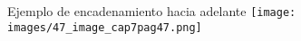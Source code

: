 \begin{frame}{Ejemplo de encadenamiento hacia adelante}
\centering
\texttt{[image: images/47\_image\_cap7pag47.png]}
\end{frame}